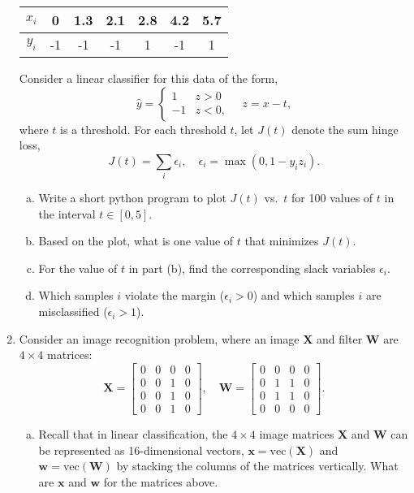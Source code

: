 \documentclass[11pt]{article}
\def\x{\times}
\newcommand{\wbf}{\mathbf{w}}
\newcommand{\xbf}{\mathbf{x}}
\newcommand{\Wbf}{\mathbf{W}}
\newcommand{\Xbf}{\mathbf{X}}
\begin{document}
\begin{enumerate}
\begin{center}
\begin{tabular}{|c|c|c|c|c|c|c|} \hline
$x_i$ & 0 & 1.3 & 2.1 & 2.8 & 4.2 & 5.7 \\ \hline
$y_i$ & -1 & -1 & -1 & 1 & -1 & 1 \\ \hline
\end{tabular}
\end{center}

Consider a linear classifier for this data of the form,
\[
    \hat{y} = \begin{cases}
        1  & z > 0 \\
        -1 & z < 0,
        \end{cases}
    \quad
    z = x-t,
\]
where $t$ is a threshold.  For each threshold $t$, let $J(t)$
denote the sum hinge loss,
\[
    J(t) = \sum_i \epsilon_i, \quad \epsilon_i = \max(0, 1-y_iz_i).
\]

\begin{enumerate}[(a)]
\item Write a short python program to plot $J(t)$ vs.\ $t$ for
100 values of $t$ in the interval $t \in [0,5]$.

\item Based on the plot, what is one value of $t$ that minimizes
$J(t)$.

\item For the value of $t$ in part (b), find the corresponding
slack variables $\epsilon_i$.

\item Which samples $i$ violate the margin ($\epsilon_i > 0$)
and which samples $i$ are misclassified ($\epsilon_i > 1$).

\end{enumerate}

\item
Consider an image recognition problem, where an image $\Xbf$
and filter $\Wbf$ are $4 \x 4$ matrices:
\[
    \Xbf = \left[
        \begin{array}{cccc}
        0 & 0 & 0 & 0 \\
        0 & 0 & 1 & 0 \\
        0 & 0 & 1 & 0 \\
        0 & 0 & 1 & 0
        \end{array} \right], \quad
    \Wbf = \left[
        \begin{array}{cccc}
        0 & 0 & 0 & 0 \\
        0 & 1 & 1 & 0 \\
        0 & 1 & 1 & 0 \\
        0 & 0 & 0 & 0
        \end{array} \right].
\]
\begin{enumerate}[(a)]
\item Recall that in linear classification, the $4 \x 4$
image matrices $\Xbf$ and $\Wbf$
can be represented as 16-dimensional vectors, $\xbf = \mathrm{vec}(\Xbf)$
and $\wbf = \mathrm{vec}(\Wbf)$ by stacking the columns of the matrices
vertically. What are $\xbf$ and $\wbf$ for the matrices above.


\end{enumerate}
\end{enumerate}
\end{document}
